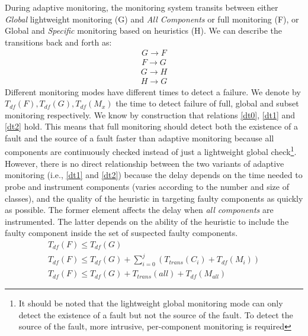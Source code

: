 
During adaptive monitoring, the monitoring system transits between either \textit{Global} lightweight monitoring (G) and \textit{All Components} or full monitoring (F), or Global and \textit{Specific} monitoring based on heuristics (H).
We can describe the transitions back and forth as:
\begin{subequations}
\begin{align}
G \rightarrow F \label{tA1}
\\F \rightarrow G \label{tA2}
\end{align}
\end{subequations}
\begin{subequations}
\begin{align}
G \rightarrow H \label{tH1}
\\ H \rightarrow G \label{tH2}
\end{align}
\end{subequations}
Different monitoring modes have different times to detect a failure.
We denote by $T_{df}(F),T_{df}(G),T_{df}(M_x)$ the time to detect failure of full, global and subset monitoring respectively. 
We know by construction that relations \eqref{dt0}, \eqref{dt1} and \eqref{dt2} hold.
This means that full monitoring should detect both the existence of a fault and the source of a fault faster than adaptive monitoring because all components are continuously checked instead of just a lightweight global check\footnote{It should be noted that the lightweight global monitoring mode can only detect the existence of a fault but not the source of the fault. To detect the source of the fault, more intrusive, per-component monitoring is required}.
However, there is no direct relationship between the two variants of adaptive monitoring (i.e., \eqref{dt1} and \eqref{dt2}) because the delay depends on the time needed to probe and instrument components (varies according to the number and size of classes), and the quality of the heuristic in targeting faulty components as quickly as possible.
The former element affects the delay when \textit{all components} are instrumented.
The latter depends on the ability of the heuristic to include the faulty component inside the set of suspected faulty components.
\begin{subequations}
\begin{align}
T_{df}(F) \le T_{df}(G) \label{dt0}
\\ T_{df}(F) \le T_{df}(G) + \sum_{i=0}^{j}(T_{trans}(C_i) + T_{df}(M_i)) \label{dt1}
\\ T_{df}(F) \le T_{df}(G) + T_{trans}(all) + T_{df}(M_{all}) \label{dt2}
\end{align}
\end{subequations}

